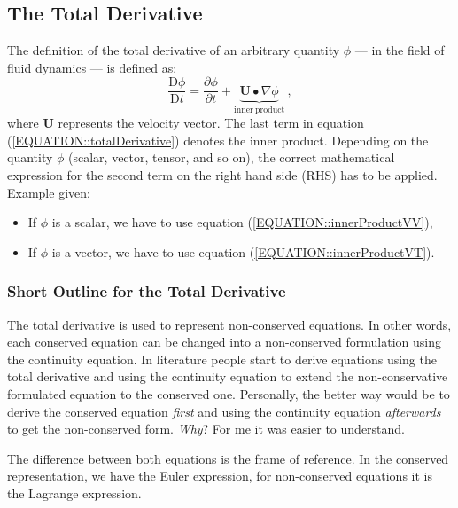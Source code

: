 \documentclass[MathematicsNumericsDerivationsAndOpenFOAM.tex]{subfiles}
\begin{document}
\subsection{The Total Derivative}
%
%
      The definition of the total derivative of an arbitrary quantity $\phi$
      --- in the field of fluid dynamics --- is defined as:
%
%
\begin{equation}
    \frac{\mathrm{D}\phi}{\mathrm{D}t} = \frac{\partial \phi}{\partial t} + \underbrace{\textbf{U}\bullet \nabla \phi}_{\mathrm{inner~product}} ~,
    \label{EQUATION::totalDerivative}
\end{equation}
%
%
	where $\textbf{U}$ represents the velocity vector. The last term in
    equation (\ref{EQUATION::totalDerivative}) denotes the inner product.
    Depending on the quantity $\phi$ (scalar, vector, tensor, and so on), the
    correct mathematical expression for the second term on the right hand side
    (RHS) has to be applied. Example given:
%
%
\begin{itemize}
    \item If $\phi$ is a scalar, we have to use equation (\ref{EQUATION::innerProductVV}),
    \item If $\phi$ is a vector, we have to use equation (\ref{EQUATION::innerProductVT}).
\end{itemize}
%
%
%
%
\subsubsection{Short Outline for the Total Derivative}
%
%
	The total derivative is used to represent non-conserved equations. In other
    words, each conserved equation can be changed into a non-conserved
    formulation using the continuity equation. In literature people start to
    derive equations using the total derivative and using the continuity
    equation to extend the non-conservative formulated equation to the conserved
    one. Personally, the better way would be to derive  the conserved equation
    \textit{first} and  using the continuity equation \textit{afterwards} to get
    the non-conserved form. \textit{Why}? For me it was easier to understand.


	The difference between both equations is the frame of reference. In the
    conserved representation, we have the Euler expression, for non-conserved
    equations it is the Lagrange expression.
\end{document}
